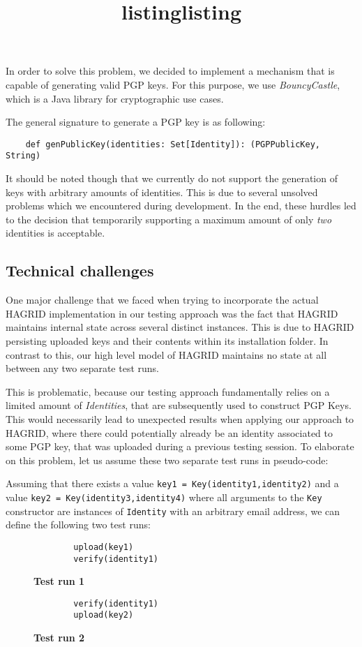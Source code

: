 In order to solve this problem, we decided to implement a mechanism that is capable of generating valid PGP keys. 
For this purpose, we use \emph{BouncyCastle}, which is a Java library for cryptographic use cases.

The general signature to generate a PGP key is as following: 
\begin{verbatim}
    def genPublicKey(identities: Set[Identity]): (PGPPublicKey, String)
\end{verbatim}
It should be noted though that we currently do not support the generation of keys with arbitrary amounts of identities. This is due to several unsolved problems which we encountered during development. In the end, these hurdles led to the decision that temporarily supporting a maximum amount of only \emph{two} identities is acceptable.
\newpage
\subsection{Technical challenges}
One major challenge that we faced when trying to incorporate the actual HAGRID implementation in our testing approach was the fact that HAGRID maintains internal state across several distinct instances. This is due to HAGRID persisting uploaded keys and their contents within its installation folder. 
In contrast to this, our high level model of HAGRID maintains no state at all between any two separate test runs.

This is problematic, because our testing approach fundamentally relies on a limited amount of \emph{Identities}, that are subsequently used to construct PGP Keys. This would necessarily lead to unexpected results when applying our approach to HAGRID, where there could potentially already be an identity associated to some PGP key, that was uploaded during a previous testing session. 
To elaborate on this problem, let us assume these two separate test runs in pseudo-code:

Assuming that there exists a value \texttt{key1 = Key(identity1,identity2)} and a value \texttt{key2 = Key(identity3,identity4)}
 where all arguments to the \texttt{Key} constructor are instances of \texttt{Identity} with an arbitrary email address, we can define the following two test runs: 
\begin{figure}[!h]
    \begin{minipage}{0.5\textwidth}
        \centering
        \begin{verbatim}
        upload(key1)
        verify(identity1)
        \end{verbatim}
        \title{listing}{\textbf{Test run 1}}
    \end{minipage}
    \begin{minipage}{0.5\textwidth}
        \centering
        \begin{verbatim}
        verify(identity1)
        upload(key2)
        \end{verbatim}
        \title{listing}{\textbf{Test run 2}}
    \end{minipage}
\end{figure}

